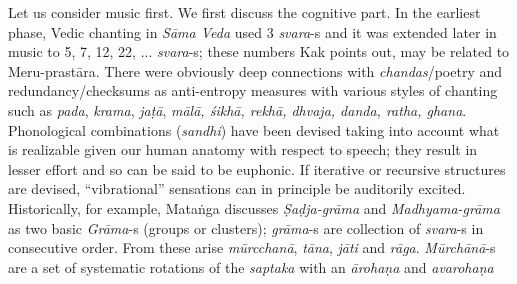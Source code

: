 Let us consider music first. We first discuss the cognitive part. In the earliest phase, Vedic chanting in \textsl{Sāma Veda} used 3 \textsl{svara}-s and it was extended later in music to 5, 7, 12, 22, ... \textsl{svara}-s; these numbers Kak points out, may be related to Meru-prastāra. There were obviously deep connections with \textsl{chandas}/poetry and redundancy/checksums as anti-entropy measures with various styles of chanting such as \textsl{pada}, \textsl{krama}, \textsl{jaṭā}, \textsl{mālā, śikhā, rekhā, dhvaja, danda, ratha, ghana}. Phonological combinations (\textsl{sandhi}) have been devised taking into account what is realizable given our human anatomy with respect to speech; they result in lesser effort and so can be said to be euphonic. If iterative or recursive structures are devised, “vibrational” sensations can in principle be auditorily excited. Historically, for example, Mataṅga discusses \textsl{Ṣaḍja-grāma} and \textsl{Madhyama-grāma} as two basic \textsl{Grāma}-s (groups or clusters); \textsl{grāma}-s are collection of \textsl{svara}-s in consecutive order. From these arise \textsl{mūrcchanā}, \textsl{tāna}, \textsl{jāti} and \textsl{rāga}. \textsl{Mūrchānā}-s are a set of systematic rotations of the \textsl{saptaka} with an \textsl{ārohaṇa} and \textsl{avarohaṇa}
